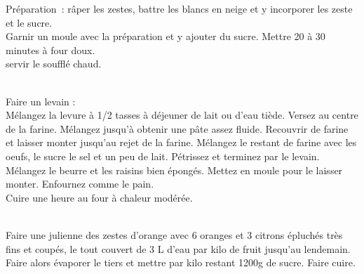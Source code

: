 \begin{minipage}[c]{\textwidth}
Préparation : râper les zestes, battre les blancs en neige et y incorporer les zeste et le sucre.\\
Garnir un moule avec la préparation et y ajouter du sucre. Mettre 20 à 30 minutes à four doux.\\
servir le soufflé chaud.\\
\\

\end{minipage}

\begin{minipage}[c]{\textwidth}
Faire un levain :\\
Mélangez la levure à 1/2 tasses à déjeuner de lait ou d'eau tiède. Versez au centre de la farine. Mélangez jusqu'à obtenir une pâte assez fluide. Recouvrir de farine et laisser monter jusqu'au rejet de la farine. Mélangez le restant de farine avec les oeufs, le sucre le sel et un peu de lait. Pétrissez et terminez par le levain. Mélangez le beurre et les raisins bien épongés. Mettez en moule pour le laisser monter. Enfournez comme le pain.\\
Cuire une heure au four à chaleur modérée.\\
\\

\end{minipage}

\begin{minipage}[c]{\textwidth}
Faire une julienne des zestes d'orange avec 6 oranges et 3 citrons épluchés très fins et coupés, le tout couvert de 3 L d'eau par kilo de fruit jusqu'au lendemain.\\
Faire alors évaporer le tiers et mettre par kilo restant 1200g de sucre. Faire cuire.\\
\\

\end{minipage}

